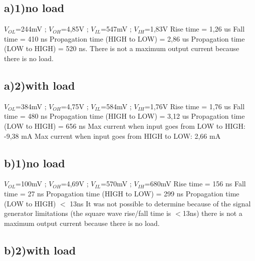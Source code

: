 \subsection*{a)1)no load}
$V_{OL}$=244mV ;
$V_{OH}$=4,85V ; 
$V_{IL}$=547mV ;
$V_{IH}$=1,83V
\newline
Rise time = 1,26 us 
\newline
Fall time = 410 ns 
\newline 
Propagation time (HIGH to LOW) = 2,86 us 
\newline
Propagation time (LOW to HIGH) = 520 ns.
\newline
There is not a maximum output current because there is no load.

\subsection*{a)2)with load} 

$V_{OL}$=384mV ; 
$V_{OH}$=4,75V ; 
$V_{IL}$=584mV ;
$V_{IH}$=1,76V 
\newline
Rise time = 1,76 us
\newline
Fall time = 480 ns
\newline
Propagation time (HIGH to LOW) = 3,12 us
\newline
Propagation time (LOW to HIGH) = 656 ns
\newline
Max current when input goes from LOW to HIGH: -9,38 mA
\newline
Max current when input goes from HIGH to LOW: 2,66 mA
\subsection*{b)1)no load}
$V_{OL}$=100mV ; 
$V_{OH}$=4,69V ; 
$V_{IL}$=570mV ; 
$V_{IH}$=680mV 
\newline
Rise time = 156 ns
\newline
Fall time = 27 ns
\newline
Propagation time (HIGH to LOW) = 299 ns
\newline
Propagation time (LOW to HIGH) $<$ 13ns
\newline
It was not possible to determine because of the signal generator limitations
(the square wave rise/fall time is $<$13ns)
there is not a maximum output current because there is no load. 

\subsection*{b)2)with load} 

